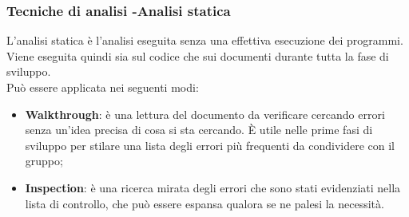 \documentclass[12pt,a4paper,titlepage]{article}
\begin{document}
\subsubsection{Tecniche di analisi -Analisi statica}
		L'analisi statica è l'analisi eseguita senza una effettiva esecuzione dei programmi. Viene eseguita quindi sia sul codice che sui documenti durante tutta la fase di sviluppo.\\
		Può essere applicata nei seguenti modi:
		\begin{itemize}
			\item \textbf{Walkthrough}: è una lettura del documento da verificare cercando errori senza un'idea precisa di cosa si sta cercando. È utile nelle prime fasi di sviluppo per stilare una lista degli errori più frequenti da condividere con il gruppo;
			\item \textbf{Inspection}: è una ricerca mirata degli errori che sono stati evidenziati nella lista di controllo, che può essere espansa qualora se ne palesi la necessità.
		\end{itemize}
\end{document}
